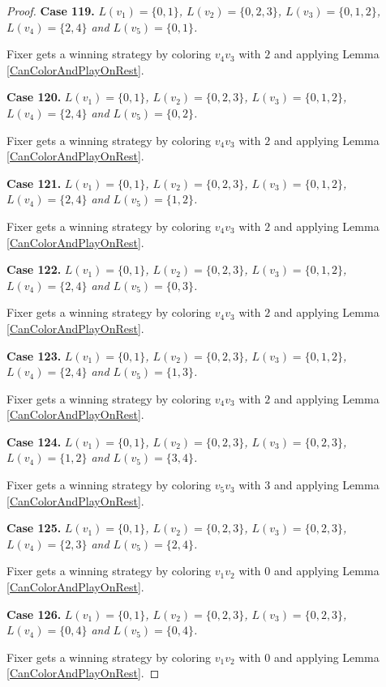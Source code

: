 \documentclass[12pt]{amsart}
\theoremstyle{plain}
\theoremstyle{definition}
\theoremstyle{remark}
\begin{document}
\begin{proof}
\noindent\textbf{Case 119.  }\textit{$L(v_1) = \{0, 1\}$, $L(v_2) = \{0, 2, 3\}$, $L(v_3) = \{0, 1, 2\}$, $L(v_4) = \{2, 4\}$ and $L(v_5) = \{0, 1\}$.}

Fixer gets a winning strategy by coloring $v_4v_3$ with $2$ and applying Lemma \ref{CanColorAndPlayOnRest}.

\noindent\textbf{Case 120.  }\textit{$L(v_1) = \{0, 1\}$, $L(v_2) = \{0, 2, 3\}$, $L(v_3) = \{0, 1, 2\}$, $L(v_4) = \{2, 4\}$ and $L(v_5) = \{0, 2\}$.}

Fixer gets a winning strategy by coloring $v_4v_3$ with $2$ and applying Lemma \ref{CanColorAndPlayOnRest}.

\noindent\textbf{Case 121.  }\textit{$L(v_1) = \{0, 1\}$, $L(v_2) = \{0, 2, 3\}$, $L(v_3) = \{0, 1, 2\}$, $L(v_4) = \{2, 4\}$ and $L(v_5) = \{1, 2\}$.}

Fixer gets a winning strategy by coloring $v_4v_3$ with $2$ and applying Lemma \ref{CanColorAndPlayOnRest}.

\noindent\textbf{Case 122.  }\textit{$L(v_1) = \{0, 1\}$, $L(v_2) = \{0, 2, 3\}$, $L(v_3) = \{0, 1, 2\}$, $L(v_4) = \{2, 4\}$ and $L(v_5) = \{0, 3\}$.}

Fixer gets a winning strategy by coloring $v_4v_3$ with $2$ and applying Lemma \ref{CanColorAndPlayOnRest}.

\noindent\textbf{Case 123.  }\textit{$L(v_1) = \{0, 1\}$, $L(v_2) = \{0, 2, 3\}$, $L(v_3) = \{0, 1, 2\}$, $L(v_4) = \{2, 4\}$ and $L(v_5) = \{1, 3\}$.}

Fixer gets a winning strategy by coloring $v_4v_3$ with $2$ and applying Lemma \ref{CanColorAndPlayOnRest}.

\noindent\textbf{Case 124.  }\textit{$L(v_1) = \{0, 1\}$, $L(v_2) = \{0, 2, 3\}$, $L(v_3) = \{0, 2, 3\}$, $L(v_4) = \{1, 2\}$ and $L(v_5) = \{3, 4\}$.}

Fixer gets a winning strategy by coloring $v_5v_3$ with $3$ and applying Lemma \ref{CanColorAndPlayOnRest}.

\noindent\textbf{Case 125.  }\textit{$L(v_1) = \{0, 1\}$, $L(v_2) = \{0, 2, 3\}$, $L(v_3) = \{0, 2, 3\}$, $L(v_4) = \{2, 3\}$ and $L(v_5) = \{2, 4\}$.}

Fixer gets a winning strategy by coloring $v_1v_2$ with $0$ and applying Lemma \ref{CanColorAndPlayOnRest}.

\noindent\textbf{Case 126.  }\textit{$L(v_1) = \{0, 1\}$, $L(v_2) = \{0, 2, 3\}$, $L(v_3) = \{0, 2, 3\}$, $L(v_4) = \{0, 4\}$ and $L(v_5) = \{0, 4\}$.}

Fixer gets a winning strategy by coloring $v_1v_2$ with $0$ and applying Lemma \ref{CanColorAndPlayOnRest}.


\end{proof}
\end{document}
